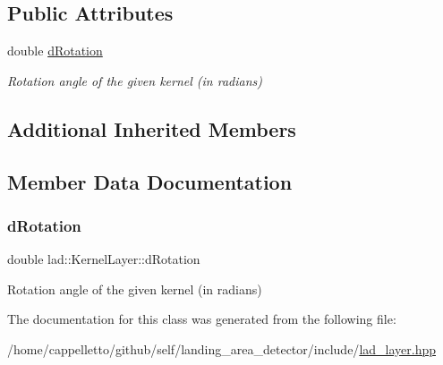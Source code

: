 \subsection*{Public Attributes}
\begin{DoxyCompactItemize}
\item 
double \hyperlink{classlad_1_1_kernel_layer_a41e48b8aa5359019629a156dd9868c17}{d\+Rotation}
\begin{DoxyCompactList}\small\item\em Rotation angle of the given kernel (in radians) \end{DoxyCompactList}\end{DoxyCompactItemize}
\subsection*{Additional Inherited Members}


\subsection{Member Data Documentation}
\mbox{\label{classlad_1_1_kernel_layer_a41e48b8aa5359019629a156dd9868c17}} 
\subsubsection{\texorpdfstring{d\+Rotation}{dRotation}}
{\footnotesize\ttfamily double lad\+::\+Kernel\+Layer\+::d\+Rotation}



Rotation angle of the given kernel (in radians) 



The documentation for this class was generated from the following file\+:\begin{DoxyCompactItemize}
\item 
/home/cappelletto/github/self/landing\+\_\+area\+\_\+detector/include/\hyperlink{lad__layer_8hpp}{lad\+\_\+layer.\+hpp}\end{DoxyCompactItemize}
